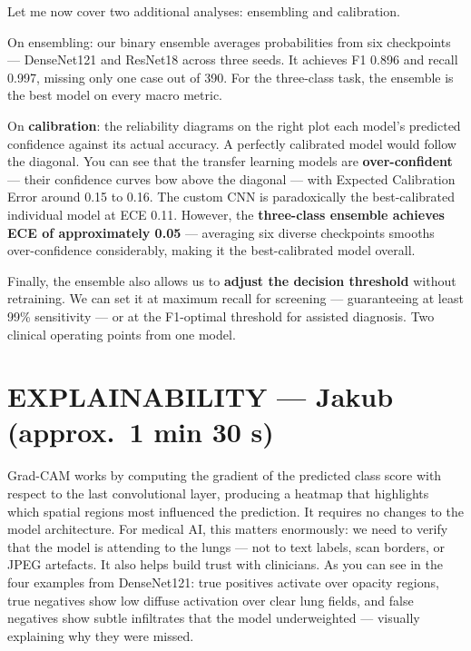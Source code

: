 \documentclass[12pt,a4paper]{article}
\newcommand{\jakub}[2]{%
  \begin{tcolorbox}[jakubbox={JAKUB \textbullet\ #1}]
  #2
  \end{tcolorbox}
}
\newcommand{\carol}[2]{%
  \begin{tcolorbox}[carolbox={CAROLINA \textbullet\ #1}]
  #2
  \end{tcolorbox}
}
\newcommand{\slidetag}[1]{%
  \noindent{\small\color{gray}\textit{[Slide #1]}}\par\smallskip
}
\newcommand{\timing}[1]{%
  \noindent{\footnotesize\color{gray!70!black}\textbf{Timing:} #1}\par\smallskip
}
\begin{document}
\carol{Slide 16 — Ensemble \& Calibration Analysis}{
Let me now cover two additional analyses: ensembling and calibration.

On ensembling: our binary ensemble averages probabilities from six checkpoints --- DenseNet121 and ResNet18 across three seeds. It achieves F1 0.896 and recall 0.997, missing only one case out of 390. For the three-class task, the ensemble is the best model on every macro metric.

On \textbf{calibration}: the reliability diagrams on the right plot each model's predicted confidence against its actual accuracy. A perfectly calibrated model would follow the diagonal. You can see that the transfer learning models are \textbf{over-confident} --- their confidence curves bow above the diagonal --- with Expected Calibration Error around 0.15 to 0.16. The custom CNN is paradoxically the best-calibrated individual model at ECE 0.11. However, the \textbf{three-class ensemble achieves ECE of approximately 0.05} --- averaging six diverse checkpoints smooths over-confidence considerably, making it the best-calibrated model overall.

Finally, the ensemble also allows us to \textbf{adjust the decision threshold} without retraining. We can set it at maximum recall for screening --- guaranteeing at least 99\% sensitivity --- or at the F1-optimal threshold for assisted diagnosis. Two clinical operating points from one model.
}

\section*{EXPLAINABILITY — Jakub (approx.\ 1 min 30 s)}

\slidetag{17 — Grad-CAM: Explainability}
\timing{$\sim$30 s}

\jakub{Slide 17 — Grad-CAM: Explainability}{
Grad-CAM works by computing the gradient of the predicted class score with respect to the last convolutional layer, producing a heatmap that highlights which spatial regions most influenced the prediction. It requires no changes to the model architecture. For medical AI, this matters enormously: we need to verify that the model is attending to the lungs --- not to text labels, scan borders, or JPEG artefacts. It also helps build trust with clinicians. As you can see in the four examples from DenseNet121: true positives activate over opacity regions, true negatives show low diffuse activation over clear lung fields, and false negatives show subtle infiltrates that the model underweighted --- visually explaining why they were missed.
}
\end{document}
